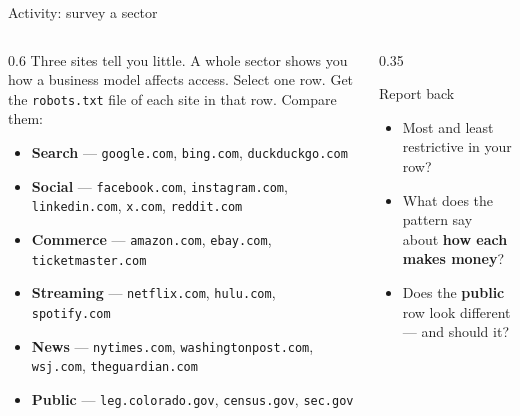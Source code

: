 \documentclass[9pt,aspectratio=169]{beamer}
\begin{document}
\begin{frame}{Activity: survey a sector}
    \begin{columns}[T]
        \begin{column}{0.6\textwidth}
            Three sites tell you little. A whole sector shows you how a business model affects access. Select one row. Get the \texttt{robots.txt} file of each site in that row. Compare them:
            \begin{itemize}\small
                \item \textbf{Search} --- \texttt{google.com}, \texttt{bing.com}, \texttt{duckduckgo.com}
                \item \textbf{Social} --- \texttt{facebook.com}, \texttt{instagram.com}, \texttt{linkedin.com}, \texttt{x.com}, \texttt{reddit.com}
                \item \textbf{Commerce} --- \texttt{amazon.com}, \texttt{ebay.com}, \texttt{ticketmaster.com}
                \item \textbf{Streaming} --- \texttt{netflix.com}, \texttt{hulu.com}, \texttt{spotify.com}
                \item \textbf{News} --- \texttt{nytimes.com}, \texttt{washingtonpost.com}, \texttt{wsj.com}, \texttt{theguardian.com}
                \item \textbf{Public} --- \texttt{leg.colorado.gov}, \texttt{census.gov}, \texttt{sec.gov}
            \end{itemize}
        \end{column}
        \begin{column}{0.35\textwidth}
            \begin{block}{Report back}
                \footnotesize
                \begin{itemize}\footnotesize
                    \item Most and least restrictive in your row?
                    \item What does the pattern say about \textbf{how each makes money}?
                    \item Does the \textbf{public} row look different --- and should it?
                \end{itemize}
            \end{block}
        \end{column}
    \end{columns}
\end{frame}
\end{document}
